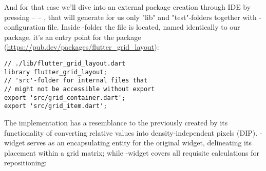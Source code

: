 
And for that case we'll dive into an external package creation through IDE by pressing  --  -- , that will generate for us only "lib" and "test"-folders together with -configuration 
file. Inside -folder the file is located, named identically to our package, it's an entry point for the package
(\href{https://pub.dev/packages/flutter_grid_layout}{https://pub.dev/packages/flutter\_grid\_layout}):

\begin{lstlisting}
// ./lib/flutter_grid_layout.dart
library flutter_grid_layout;
// 'src'-folder for internal files that 
// might not be accessible without export
export 'src/grid_container.dart';
export 'src/grid_item.dart';
\end{lstlisting}

\noindent The implementation has a resemblance to the previously created  by its functionality of 
converting relative values into density-independent pixels (DIP). -widget serves as an encapsulating 
entity for the original widget, delineating its placement within a grid matrix; while -widget covers
all requisite calculations for repositioning:

